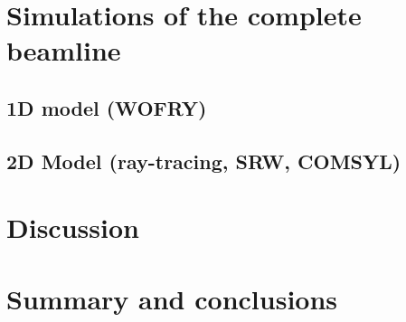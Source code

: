 \documentclass{iucr}              %
\begin{document}


\section{Simulations of the complete beamline}

\subsection{1D model (WOFRY)}

\subsection{2D Model (ray-tracing, SRW, COMSYL)}

\section{Discussion}

\section{Summary and conclusions}

\appendix
\end{document}
